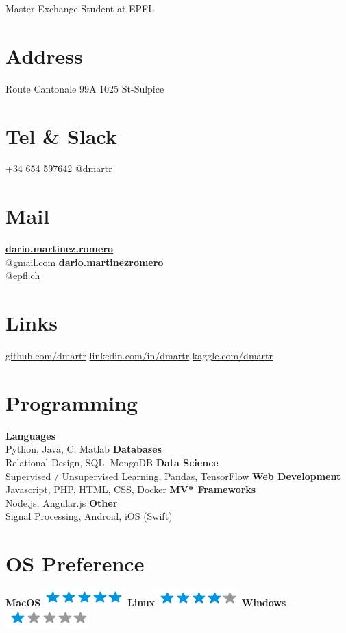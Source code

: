 \documentclass[]{friggeri-cv}
\begin{document}
      {Master Exchange Student at EPFL}
      

\begin{aside}
  \section{Address}
    Route Cantonale 99A 
    1025 St-Sulpice
    ~
  \section{Tel \& Slack}
    +34 654 597642
    @dmartr
    ~
  \section{Mail}
    \href{mailto:dario.martinez.romero@gmail.com}{\textbf{dario.martinez.romero}\\@gmail.com}
    \href{mailto:dario.martinezromero@epfl.ch}{\textbf{dario.martinezromero}\\@epfl.ch}
    ~
  \section{Links}
  \href{https://github.com/dmartr}{github.com/dmartr}
    \href{http://www.ch.linkedin.com/in/dariomrt}{linkedin.com/in/dmartr}
    \href{https://www.kaggle.com/dmartr}{kaggle.com/dmartr}
    ~
  \section{Programming}
    \textbf{Languages\\} Python, Java, C, Matlab
    \textbf{Databases\\} Relational Design, SQL, MongoDB
    \textbf{Data Science\\} Supervised / Unsupervised Learning, Pandas, TensorFlow 
    \textbf{Web Development\\} Javascript, PHP, HTML, CSS, Docker
    \textbf{MV* Frameworks\\} Node.js, Angular.js
    \textbf{Other\\} Signal Processing, Android, iOS (Swift)
    ~
  \section{OS Preference}
    \textbf{MacOS}\includegraphics[scale=0.40]{img/5stars.png}
    \textbf{Linux}\includegraphics[scale=0.40]{img/4stars.png}
    \textbf{Windows}\includegraphics[scale=0.40]{img/1stars.png}
    ~

\end{aside}
\end{document}
